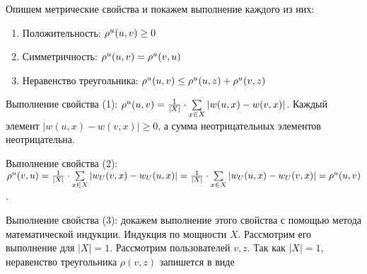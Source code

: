 Опишем метрические свойства \cite{matan} и покажем выполнение каждого из них:
\begin{enumerate}
\item Положительность: ${\mathcal{\rho}}^u(u,v) \ge 0$
\item Симметричность: ${\mathcal{\rho}}^u(u,v) = {\mathcal{\rho}}^u(v,u)$
\item Неравенство треугольника: ${\mathcal{\rho}}^u(u, v) \le {\mathcal{\rho}}^u(u,z) + {\mathcal{\rho}}^u(v,z)$
\end{enumerate}
Выполнение свойства (1): ${\mathcal{\rho}}^u(u,v) = \frac{1}{|X|}
\cdot \sum \limits_{x \in X} |w(u,x) - w(v,x)|$. Каждый
элемент $|w(u,x) - w(v,x)| \ge 0$, а сумма неотрицательных
элементов неотрицательна.

Выполнение свойства (2): ${\mathcal{\rho}}^u(v,u) = \frac{1}{|X|} \cdot \sum \limits_{x \in X} |w_U(v,x) - w_U(u,x)| =
\frac{1}{|X|} \cdot \sum \limits_{x \in X} |w_U(u,x) - w_U(v,x)| = {\mathcal{\rho}}^u(u,v)$.

Выполнение свойства (3): докажем выполнение этого свойства с помощью метода математической индукции. Индукция по мощности $X$.
Рассмотрим его выполнение для $|X| = 1$. Рассмотрим пользователей $v,z$.
Так как $|X| = 1$, неравенство треугольника $\rho(v,z)$ запишется в виде

